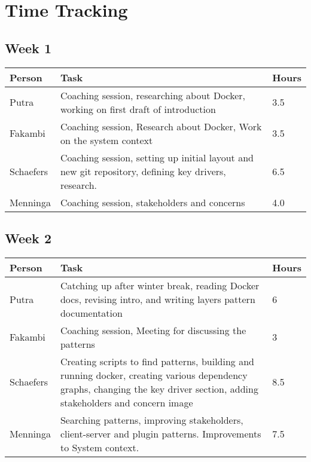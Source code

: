 \chapter{Time Tracking}
\label{App: Time Tracking}

\section*{Week 1}
\begin{longtable}{p{} p{} p{}}
	\textbf{Person} & \textbf{Task} & \textbf{Hours} \\ \toprule
	Putra           & Coaching session, researching about Docker, working on first draft of introduction 	& 3.5	\\ \midrule
	Fakambi         & Coaching session, Research about Docker, Work on the system context & 3.5	\\ \midrule
	Schaefers       & Coaching session, setting up initial layout and new git repository, defining key drivers, research. &  6.5 	\\ \midrule
	Menninga        & Coaching session, stakeholders and concerns & 4.0 \\ \bottomrule
\end{longtable}

\section*{Week 2}
\begin{longtable}{p{} p{} p{}}
	\textbf{Person} & \textbf{Task} & \textbf{Hours} \\ \toprule
	Putra           & Catching up after winter break, reading Docker docs, revising intro, and writing layers pattern documentation & 6	\\ \midrule
	Fakambi         & Coaching session, Meeting for discussing the patterns & 3 \\ \midrule
	Schaefers       & Creating scripts to find patterns, building and running docker, creating various dependency graphs, changing the key driver section, adding stakeholders and concern image & 8.5 \\ \midrule
	Menninga        & Searching patterns, improving stakeholders, client-server and plugin patterns. Improvements to System context. & 7.5 \\ \bottomrule
\end{longtable}

